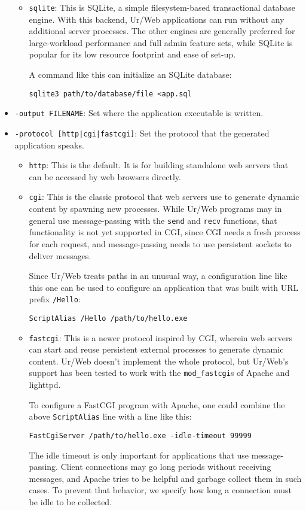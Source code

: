 \documentclass{article}
\begin{document}
\begin{itemize}
\begin{itemize}
  \item \texttt{sqlite}: This is SQLite, a simple filesystem-based transactional database engine.  With this backend, Ur/Web applications can run without any additional server processes.  The other engines are generally preferred for large-workload performance and full admin feature sets, while SQLite is popular for its low resource footprint and ease of set-up.

    A command like this can initialize an SQLite database:
    \begin{verbatim}
sqlite3 path/to/database/file <app.sql
    \end{verbatim}
  \end{itemize}

\item \texttt{-output FILENAME}: Set where the application executable is written.

\item \texttt{-protocol [http|cgi|fastcgi]}: Set the protocol that the generated application speaks.
  \begin{itemize}
  \item \texttt{http}: This is the default.  It is for building standalone web servers that can be accessed by web browsers directly.

  \item \texttt{cgi}: This is the classic protocol that web servers use to generate dynamic content by spawning new processes.  While Ur/Web programs may in general use message-passing with the \texttt{send} and \texttt{recv} functions, that functionality is not yet supported in CGI, since CGI needs a fresh process for each request, and message-passing needs to use persistent sockets to deliver messages.

    Since Ur/Web treats paths in an unusual way, a configuration line like this one can be used to configure an application that was built with URL prefix \texttt{/Hello}:
    \begin{verbatim}
ScriptAlias /Hello /path/to/hello.exe
    \end{verbatim}

  \item \texttt{fastcgi}: This is a newer protocol inspired by CGI, wherein web servers can start and reuse persistent external processes to generate dynamic content.  Ur/Web doesn't implement the whole protocol, but Ur/Web's support has been tested to work with the \texttt{mod\_fastcgi}s of Apache and lighttpd.

    To configure a FastCGI program with Apache, one could combine the above \texttt{ScriptAlias} line with a line like this:
    \begin{verbatim}
FastCgiServer /path/to/hello.exe -idle-timeout 99999
    \end{verbatim}
    The idle timeout is only important for applications that use message-passing.  Client connections may go long periods without receiving messages, and Apache tries to be helpful and garbage collect them in such cases.  To prevent that behavior, we specify how long a connection must be idle to be collected.


\end{itemize}
\end{itemize}
\end{document}

